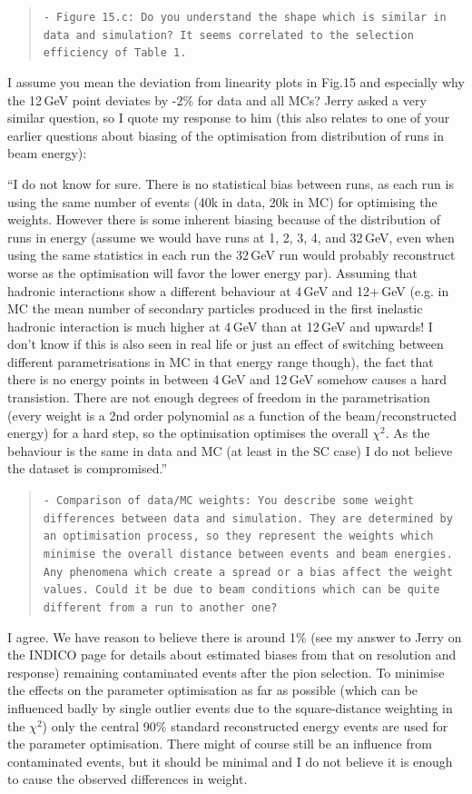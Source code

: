 \documentclass[twoside,a4paper,12pt]{article}
\begin{document}
\begin{quote}\texttt{- Figure 15.c:
Do you understand the shape which is similar in data and simulation? It seems correlated to the selection efficiency of Table 1.}\end{quote}
I assume you mean the deviation from linearity plots in Fig.15 and especially why the 12\,GeV point deviates by -2\% for data and all MCs?
Jerry asked a very similar question, so I quote my response to him (this also relates to one of your earlier questions about biasing of the optimisation from distribution of runs in beam energy):

``I do not know for sure. There is no statistical bias between runs, as each run is using the same number of events (40k in data, 20k in MC) for optimising the weights. However there is some inherent biasing because of the distribution of runs in energy (assume we would have runs at 1, 2, 3, 4, and 32\,GeV, even when using the same statistics in each run the 32\,GeV run would probably reconstruct worse as the optimisation will favor the lower energy par). Assuming that hadronic interactions show a different behaviour at 4\,GeV and 12+\,GeV (e.g. in MC the mean number of secondary particles produced in the first inelastic hadronic interaction is much higher at 4\,GeV than at 12\,GeV and upwards! I don't know if this is also seen in real life or just an effect of switching between different parametrisations in MC in that energy range though), the fact that there is no energy points in between 4\,GeV and 12\,GeV somehow causes a hard transistion. There are not enough degrees of freedom in the parametrisation (every weight is a 2nd order polynomial as a function of the beam/reconstructed energy) for a hard step, so the optimisation optimises the overall $\chi^2$. As the behaviour is the same in data and MC (at least in the SC case) I do not believe the dataset is compromised.''

\begin{quote}\texttt{- Comparison of data/MC weights:
You describe some weight differences between data and simulation.
They are determined by an optimisation process, so they represent the weights which minimise the overall distance between events and beam energies. Any phenomena which create a spread or a bias affect the weight values. Could it be due to beam conditions which can be quite different from a run to another one?}\end{quote}
I agree. We have reason to believe there is around 1\% (see my answer to Jerry on the INDICO page for details about estimated biases from that on resolution and response) remaining contaminated events after the pion selection. To minimise the effects on the parameter optimisation as far as possible (which can be influenced badly by single outlier events due to the square-distance weighting in the $\chi^2$) only the central 90\% standard reconstructed energy events are used for the parameter optimisation. There might of course still be an influence from contaminated events, but it should be minimal and I do not believe it is enough to cause the observed differences in weight.
\end{document}
